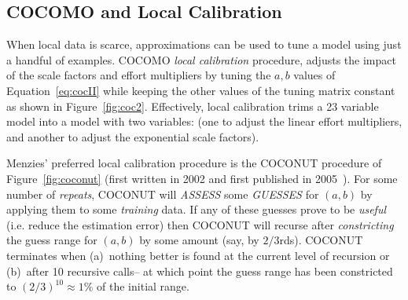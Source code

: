 \documentclass[smallcondesed]{svjour3}
\newcommand{\fig}[1]{Figure~\ref{fig:#1}}
\begin{document}
\subsection{COCOMO and Local Calibration}\label{sect:coconut}
When local data is scarce, approximations can be used to
tune a model using just a handful of examples.  
 COCOMO   {\em local calibration} procedure, adjusts the impact of the scale factors and effort
multipliers by tuning the  $a,b$ values of Equation~\ref{eq:cocII}
while keeping the other values of the tuning matrix constant as
shown in \fig{coc2}. Effectively, local calibration trims
a 23 variable model
into a model with two variables: (one  to adjust the linear effort
multipliers, and another to adjust the exponential scale factors).

Menzies' preferred local calibration procedure is the COCONUT
procedure of \fig{coconut} (first written in 2002
and first published in 2005~\cite{me04h}). 
For some number of {\em repeats},
COCONUT will {\em ASSESS} some {\em GUESSES} 
 for $(a,b)$ by applying them to some
{\em training} data. If any of these guesses prove to
be {\em useful} (i.e. reduce the estimation error) then COCONUT will recurse after
{\em constricting} the guess range for $(a,b)$ by some amount (say, by $2/3$rds). COCONUT terminates
when (a)~nothing better is found at the current level of recursion
or (b)~after 10 recursive calls-- at which point the guess range
has been constricted to  $(2/3)^{10}\approx 1$\% of the initial range.

 
\end{document}
